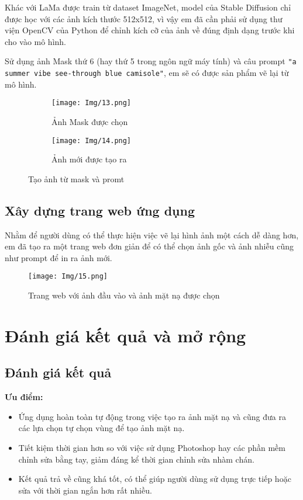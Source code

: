 \documentclass[12pt]{report}
\begin{document}
Khác với LaMa được train từ dataset ImageNet, model của Stable Diffusion chỉ được học với các ảnh kích thước 512x512, vì vậy em đã cần phải sử dụng thư viện OpenCV của Python để chỉnh kích cỡ của ảnh về đúng định dạng trước khi cho vào mô hình.

Sử dụng ảnh Mask thứ 6 (hay thứ 5 trong ngôn ngữ máy tính) và câu prompt \texttt{"a summer vibe see-through blue camisole"}, em sẽ có được sản phẩm vẽ lại từ mô hình.

\begin{figure}[h]
    \centering
    \begin{subfigure}[b]{0.48\textwidth}
        \texttt{[image: Img/13.png]}
        \caption{Ảnh Mask được chọn}
        \label{fig:image1}
    \end{subfigure}
    \hfill
    \begin{subfigure}[b]{0.48\textwidth}
        \texttt{[image: Img/14.png]}
        \caption{Ảnh mới được tạo ra}
        \label{fig:image2}
    \end{subfigure}
    \caption{Tạo ảnh từ mask và promt}
    \label{fig:combined}
\end{figure}


\subsection{Xây dựng trang web ứng dụng}

Nhằm để người dùng có thể thực hiện việc vẽ lại hình ảnh một cách dễ dàng hơn, em đã tạo ra một trang web đơn giản để có thể chọn ảnh gốc và ảnh nhiễu cũng như prompt để in ra ảnh mới.

\begin{figure}[H]
    \centering
    \texttt{[image: Img/15.png]}
    \caption{Trang web với ảnh đầu vào và ảnh mặt nạ được chọn}
\end{figure}
\section{Đánh giá kết quả và mở rộng}

\subsection{ Đánh giá kết quả}

\textbf{Ưu điểm:}
\begin{itemize}
    \item Ứng dụng hoàn toàn tự động trong việc tạo ra ảnh mặt nạ và cũng đưa ra các lựa chọn tự chọn vùng để tạo ảnh mặt nạ.
    \item Tiết kiệm thời gian hơn so với việc sử dụng Photoshop hay các phần mềm chỉnh sửa bằng tay, giảm đáng kể thời gian chỉnh sửa nhàm chán.
    \item Kết quả trả về cũng khá tốt, có thể giúp người dùng sử dụng trực tiếp hoặc sửa với thời gian ngắn hơn rất nhiều.
\end{itemize}
\end{document}
